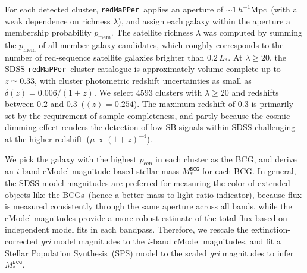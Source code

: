 \documentclass[fleqn,usenatbib]{mnras}
\newcommand{\avg}[1]{\left\langle #1 \right\rangle}
\newcommand{\msbcg}{M_*^{\texttt{BCG}}}
\newcommand{\hmpc}{h^{-1}\mathrm{Mpc}}
\newcommand{\pcen}{p_{\mathrm{cen}}}
\newcommand{\pmem}{p_{\mathrm{mem}}}
\newcommand\redmapper{\texttt{redMaPPer}}
\providecommand{\DIFaddtex}[1]{{\protect\color{blue}\uwave{#1}}} %
\providecommand{\DIFaddbegin}{} %
\providecommand{\DIFaddend}{} %
\providecommand{\DIFadd}[1]{\texorpdfstring{\DIFaddtex{#1}}{#1}} %
\newcommand{\DIFaddincludegraphics}[2][]{{\color{blue}\fbox{\DIFOincludegraphics[#1]{#2}}}} %
\DeclareRobustCommand{\DIFaddbegin}{\DIFOaddbegin \let\includegraphics\DIFaddincludegraphics} %
\DeclareRobustCommand{\DIFaddend}{\DIFOaddend \let\includegraphics\DIFOincludegraphics} %
\begin{document}
For each detected cluster, \redmapper~applies an aperture of
${\sim}1\,\hmpc$~(with a weak dependence on richness $\lambda$), and assign
each galaxy within the aperture a membership probability $\pmem$. The
satellite richness $\lambda$ was computed by summing the $\pmem$ of all
member galaxy candidates, which roughly corresponds to the number of
red-sequence satellite galaxies brighter than $0.2\,L_*$. At
$\lambda{\geq}20$, the SDSS \redmapper~cluster catalogue is approximately
volume-complete up to $z{\simeq}0.33$, with cluster photometric redshift
uncertainties as small as $\delta(z){=}0.006/(1+z)$.  We select $4593$
clusters with $\lambda{\geq}20$ and redshifts between $0.2$ and
$0.3$~($\avg{z}{=}0.254$). The maximum redshift of $0.3$ is primarily set
by the requirement of sample completeness, and partly because the cosmic
dimming effect renders the detection of low-SB signals within SDSS
challenging at the higher redshift~($\mu \propto (1+z)^{-4}$).


We pick the galaxy with the highest $\pcen$ in each cluster as the BCG, and
derive an $i$-band cModel magnitude-based stellar mass $\msbcg$ for each
BCG.  In general, the SDSS model magnitudes are preferred for measuring the
color of extended objects like the BCGs~(hence a better mass-to-light ratio
indicator), because flux is measured consistently through the same aperture
across all bands, while the cModel magnitudes provide a more robust
estimate of the total flux based on independent model fits in each
bandpass\DIFaddbegin \DIFadd{~\mbox{%
\citep[but see][]{Bernardi2017}}\hspace{0pt}%
}\DIFaddend . Therefore, we rescale the extinction-corrected {\it gri} model magnitudes to the $i$-band cModel magnitudes, and fit a Stellar Population
Synthesis~(SPS) model to the scaled {\it gri} magnitudes
to infer $\msbcg$.
\end{document}
